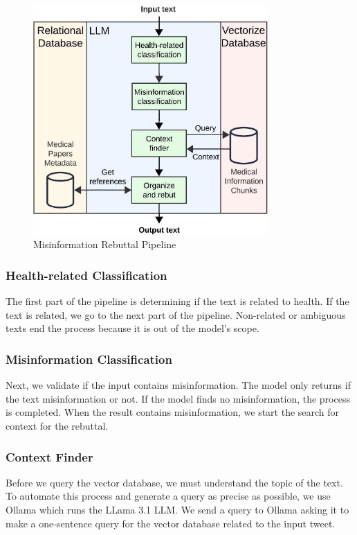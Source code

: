 \begin{figure}[!htb]
	\begin{center}
		\includegraphics[width=0.8\textwidth]{figures/LLM_Pipeline.jpeg} 
	\end{center}
	\caption{Misinformation Rebuttal Pipeline}
	\label{fig:llm}
\end{figure}


\subsubsection{Health-related Classification}
The first part of the pipeline is determining if the text is related to health. If the text is related, we go to the next part of the pipeline. Non-related or ambiguous texts end the process because it is out of the model's scope. 

\subsubsection{Misinformation Classification}
Next, we validate if the input contains misinformation. The model  only returns if the text misinformation or not. If the model finds no misinformation, the process is completed. When the result contains misinformation, we start the search for context for the rebuttal.

\subsubsection{Context Finder}
Before we  query the vector database, we must understand the topic of the text. To automate this process and generate a query as precise as possible, we use Ollama \cite{ollama} which runs the LLama 3.1 LLM. We send a query to Ollama asking it to make a one-sentence query for the vector database related to the input tweet.

